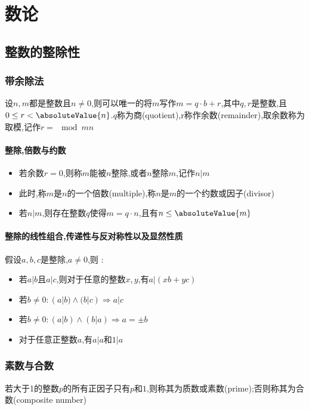 \chapter{数论}{

\section{整数的整除性}{

\subsection{带余除法}{
    设$n,m$都是整数且$n \neq 0$,则可以唯一的将$m$写作$m = q \cdot b + r$,其中$q,r$是整数,且$0 \leq r < \absoluteValue{n}$.$q$称为商(quotient),r称作余数(remainder),取余数称为取模,记作$r = \mod{m}{n}$

    \subsubsection{整除,倍数与约数}{
        \begin{itemize}
            \item 若余数$r = 0$,则称$m$能被$n$整除,或者$n$整除$m$,记作$n | m$
            \item 此时,称$m$是$n$的一个倍数(multiple),称$n$是$m$的一个约数或因子(divisor)
            \item 若$n | m$,则存在整数$q$使得$m = q \cdot n$,且有$n \leq \absoluteValue{m}$
        \end{itemize}
    }%

    \subsubsection{整除的线性组合,传递性与反对称性以及显然性质}{
        假设$a,b,c$是整除,$a \neq 0$,则 : 
        \begin{itemize}
            \item 若$a | b$且$a | c$,则对于任意的整数$x,y$,有$a | (xb + yc)$
            \item 若$b \neq 0: (a|b) \land (b | c) \Rightarrow a | c$
            \item 若$b \neq 0: (a | b) \land (b | a) \Rightarrow a = \pm b$
            \item 对于任意正整数$a$,有$a | a$和$1 | a$
        \end{itemize}
    }%

}

\subsection{素数与合数}{
若大于1的整数$p$的所有正因子只有$p$和$1$,则称其为质数或素数(prime);否则称其为合数(composite number)
 
}}}
